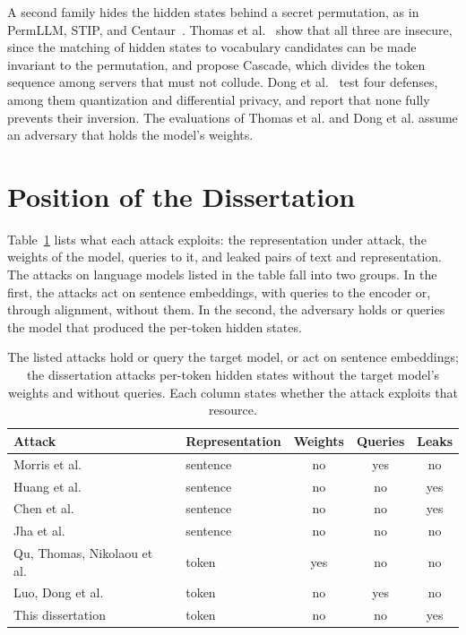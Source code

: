 A second family hides the hidden states behind a secret permutation, as in PermLLM, STIP, and Centaur~\cite{zheng2024permllm,yuan2023secure,luo2025centaur}.
Thomas et al.~\cite{thomas2025hidden} show that all three are insecure, since the matching of hidden states to vocabulary candidates can be made invariant to the permutation, and propose Cascade, which divides the token sequence among servers that must not collude.
Dong et al.~\cite{dong2025depth} test four defenses, among them quantization and differential privacy, and report that none fully prevents their inversion.
The evaluations of Thomas et al. and Dong et al. assume an adversary that holds the model's weights.


\section{Position of the Dissertation}\label{sec:lit:position}

Table~\ref{tab:lit:position} lists what each attack exploits: the representation under attack, the weights of the model, queries to it, and leaked pairs of text and representation.
The attacks on language models listed in the table fall into two groups.
In the first, the attacks act on sentence embeddings, with queries to the encoder or, through alignment, without them.
In the second, the adversary holds or queries the model that produced the per-token hidden states.

\begin{table}[ht]
\caption{The listed attacks hold or query the target model, or act on sentence embeddings; the dissertation attacks per-token hidden states without the target model's weights and without queries.
Each column states whether the attack exploits that resource.}
\label{tab:lit:position}
\centering
\ssp\small
\begin{tabular}{@{}>{\raggedright\arraybackslash}p{}lccc@{}}
\toprule
Attack & Representation & Weights & Queries & Leaks \\
\midrule
Morris et al.~\cite{morris2023text} & sentence & no & yes & no \\
Huang et al.~\cite{huang2024transferable} & sentence & no & no & yes \\
Chen et al.~\cite{chen2025algen} & sentence & no & no & yes \\
Jha et al.~\cite{jha2025harnessing} & sentence & no & no & no \\
\midrule
Qu, Thomas, Nikolaou et al.~\cite{qu2025prompt,thomas2025hidden,nikolaou2026language} & token & yes & no & no \\
Luo, Dong et al.~\cite{luo2025prompt,dong2025depth} & token & no & yes & no \\
This dissertation & token & no & no & yes \\
\bottomrule
\end{tabular}
\end{table}

